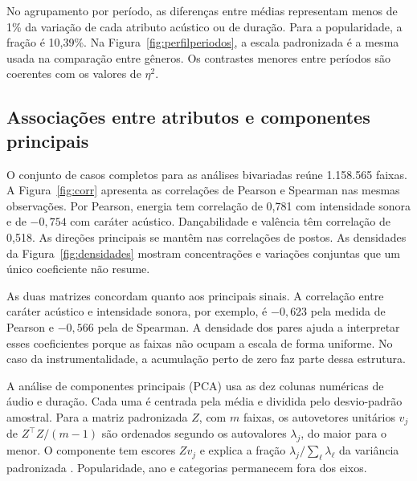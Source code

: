 
No agrupamento por período, as diferenças entre médias representam menos de 1\% da variação de cada atributo acústico ou de duração. Para a popularidade, a fração é 10,39\%. Na Figura~\ref{fig:perfilperiodos}, a escala padronizada é a mesma usada na comparação entre gêneros. Os contrastes menores entre períodos são coerentes com os valores de $\eta^2$.


\subsection{Associações entre atributos e componentes principais}
O conjunto de casos completos para as análises bivariadas reúne 1.158.565 faixas. A Figura~\ref{fig:corr} apresenta as correlações de Pearson e Spearman nas mesmas observações. Por Pearson, energia tem correlação de 0,781 com intensidade sonora e de $-0,754$ com caráter acústico. Dançabilidade e valência têm correlação de 0,518. As direções principais se mantêm nas correlações de postos. As densidades da Figura~\ref{fig:densidades} mostram concentrações e variações conjuntas que um único coeficiente não resume.


As duas matrizes concordam quanto aos principais sinais. A correlação entre caráter acústico e intensidade sonora, por exemplo, é $-0,623$ pela medida de Pearson e $-0,566$ pela de Spearman. A densidade dos pares ajuda a interpretar esses coeficientes porque as faixas não ocupam a escala de forma uniforme. No caso da instrumentalidade, a acumulação perto de zero faz parte dessa estrutura.


A análise de componentes principais (PCA) usa as dez colunas numéricas de áudio e duração. Cada uma é centrada pela média e dividida pelo desvio-padrão amostral. Para a matriz padronizada $Z$, com $m$ faixas, os autovetores unitários $v_j$ de $Z^\top Z/(m-1)$ são ordenados segundo os autovalores $\lambda_j$, do maior para o menor. O componente tem escores $Zv_j$ e explica a fração $\lambda_j/\sum_\ell\lambda_\ell$ da variância padronizada \cite{jolliffe2002,jolliffe2016}. Popularidade, ano e categorias permanecem fora dos eixos.

